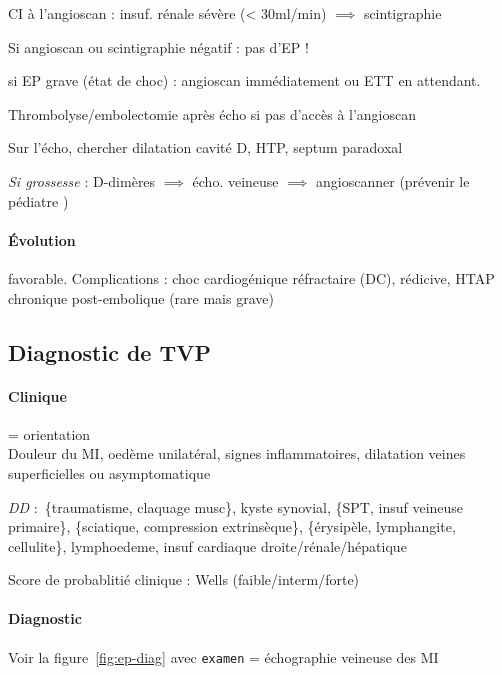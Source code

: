 CI à l'angioscan : insuf. rénale sévère (< 30ml/min) $\implies$ scintigraphie

Si angioscan ou scintigraphie négatif : pas d'EP !

\begin{tcolorbox}
\danger{} si EP grave (état de choc) : angioscan immédiatement ou ETT en
attendant.

\skull{} Thrombolyse/embolectomie après écho si pas d'accès à l'angioscan
\end{tcolorbox}

Sur l'écho, chercher dilatation cavité D, HTP, septum paradoxal

\textit{Si grossesse}  : D-dimères $\implies$ écho. veineuse $\implies$ angioscanner
(prévenir le pédiatre \skull)

\paragraph{Évolution} favorable. Complications : choc cardiogénique réfractaire
(DC), rédicive, HTAP chronique post-embolique (rare mais grave)

\subsection{Diagnostic de TVP}
\paragraph{Clinique} = orientation\\
Douleur du MI, oedème unilatéral, signes inflammatoires, dilatation veines
superficielles ou asymptomatique

\textit{DD}  : \{traumatisme, claquage musc\}, kyste synovial, \{SPT, insuf veineuse
primaire\}, \{sciatique, compression extrinsèque\}, \{érysipèle, lymphangite,
cellulite\}, lymphoedeme, insuf cardiaque droite/rénale/hépatique

Score de probablitié clinique : Wells (faible/interm/forte)

\paragraph{Diagnostic}
Voir la figure~\ref{fig:ep-diag} avec \texttt{examen} = échographie veineuse
des MI

